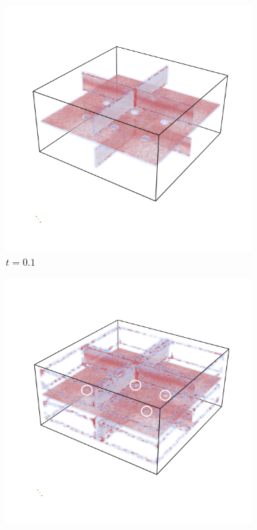 \begin{figure}
    \centering
    \begin{subfigure}[]{0.7\textwidth}
        \includegraphics[width=\textwidth]{Images/MCridge.png}
        \caption{$t=0.1$}
        \label{fig:MCridge}
    \end{subfigure}
    \begin{subfigure}[]{0.49\textwidth}
        \includegraphics[width=\textwidth]{Images/MCridgetol.png}

\end{subfigure}
\end{figure}
